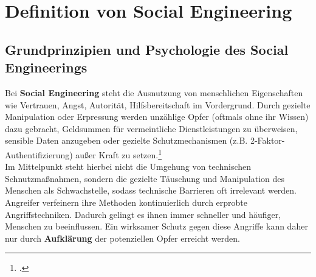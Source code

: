 \documentclass[12pt, a4paper, oneside]{scrartcl}
\begin{document}
\section{Definition von Social Engineering}

\subsection{Grundprinzipien und Psychologie des Social Engineerings}
Bei \textbf{Social Engineering} steht die Ausnutzung von menschlichen Eigenschaften wie 
Vertrauen, Angst, Autorität, Hilfsbereitschaft im Vordergrund. Durch gezielte Manipulation
oder Erpressung werden unzählige Opfer (oftmals ohne ihr Wissen) dazu gebracht, Geldsummen
für vermeintliche Dienstleistungen zu überweisen, sensible Daten anzugeben oder gezielte Schutzmechanismen
(z.B. 2-Faktor-Authentifizierung) außer Kraft zu setzen.\footcite{BSISocialEngineering}\\
Im Mittelpunkt steht hierbei nicht die Umgehung von technischen Schnutzmaßnahmen, sondern die gezielte
Täuschung und Manipulation des Menschen als Schwachstelle, sodass technische Barrieren 
oft irrelevant werden. Angreifer verfeinern ihre Methoden kontinuierlich durch erprobte Angriffstechniken. 
Dadurch gelingt es ihnen immer schneller und häufiger, Menschen zu beeinflussen.
Ein wirksamer Schutz gegen diese Angriffe kann daher nur durch \textbf{Aufklärung} der 
potenziellen Opfer erreicht werden.
\end{document}
